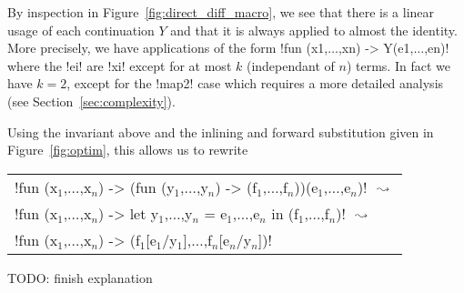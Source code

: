 By inspection in Figure~\ref{fig:direct_diff_macro}, 
we see that there is a linear usage of  each continuation $Y$ 
and that it is always applied to almost the identity. 
More precisely, we have applications of the form !fun (x1,$\ldots$,xn) -> Y(e1,$\ldots$,en)! 
where the !ei! are !xi! except for at most $k$ (independant of $n$) terms.
In fact we have $k=2$, except for the !map2! case which requires a more detailed analysis (see Section~\ref{sec:complexity}).

Using the invariant above and the inlining and forward substitution given in Figure~\ref{fig:optim}, this allows us to rewrite

\begin{tabular}{l}
!fun (x$_{1}$,$\ldots$,x$_n$) -> (fun (y$_{1}$,$\ldots$,y$_n$) -> (f$_{1}$,$\ldots$,f$_n$))(e$_{1}$,$\ldots$,e$_n$)! 
$\text{ $\leadsto$ }$ \\
!fun (x$_{1}$,$\ldots$,x$_n$) -> let y$_{1}$,$\ldots$,y$_n$ = e$_1$,$\ldots$,e$_n$ in (f$_{1}$,$\ldots$,f$_n$)!
$\text{ $\leadsto$ }$ \\
!fun (x$_{1}$,$\ldots$,x$_n$) -> (f$_{1}$[e$_{1}$/y$_{1}$],$\ldots$,f$_n$[e$_n$/y$_n$])!
\end{tabular}

TODO: finish explanation

